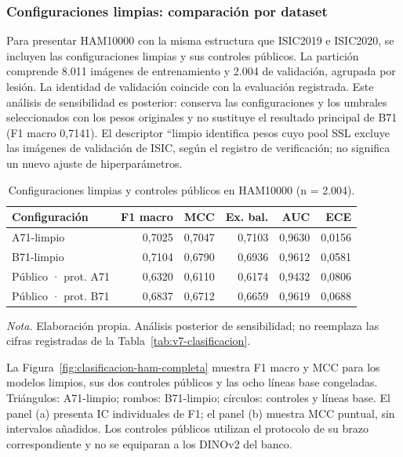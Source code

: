 \subsubsection{Configuraciones limpias: comparación por dataset}
Para presentar HAM10000 con la misma estructura que ISIC2019 e ISIC2020, se incluyen las configuraciones limpias y sus controles públicos. La partición comprende 8.011 imágenes de entrenamiento y 2.004 de validación, agrupada por lesión. La identidad de validación coincide con la evaluación registrada. Este análisis de sensibilidad es posterior: conserva las configuraciones y los umbrales seleccionados con los pesos originales y no sustituye el resultado principal de B71 (F1 macro 0,7141). El descriptor ``limpio identifica pesos cuyo pool SSL excluye las imágenes de validación de ISIC, según el registro de verificación; no significa un nuevo ajuste de hiperparámetros.

\begin{table}[!htbp]
\centering
\caption{Configuraciones limpias y controles públicos en HAM10000 (n = 2.004).}
\label{tab:ham-limpio}
\begingroup\fontsize{11}{13}\selectfont\singlespacing
\begin{tabularx}{\textwidth}{@{}Lrrrrr@{}}
\toprule
Configuración & F1 macro & MCC & Ex. bal. & AUC & ECE \\
\midrule
A71-limpio & 0,7025 & 0,7047 & 0,7103 & 0,9630 & 0,0156 \\
B71-limpio & 0,7104 & 0,6790 & 0,6936 & 0,9612 & 0,0581 \\
Público · prot. A71 & 0,6320 & 0,6110 & 0,6174 & 0,9432 & 0,0806 \\
Público · prot. B71 & 0,6837 & 0,6712 & 0,6659 & 0,9619 & 0,0688 \\
\bottomrule
\end{tabularx}
\par\smallskip\raggedright\textit{Nota.} Elaboración propia. Análisis posterior de sensibilidad; no reemplaza las cifras registradas de la Tabla~\ref{tab:v7-clasificacion}.\par\endgroup
\end{table}
\FloatBarrier
La Figura~\ref{fig:clasificacion-ham-completa} muestra F1 macro y MCC para los modelos limpios, sus dos controles públicos y las ocho líneas base congeladas. Triángulos: A71-limpio; rombos: B71-limpio; círculos: controles y líneas base. El panel (a) presenta IC individuales de F1; el panel (b) muestra MCC puntual, sin intervalos añadidos. Los controles públicos utilizan el protocolo de su brazo correspondiente y no se equiparan a los DINOv2 del banco.

